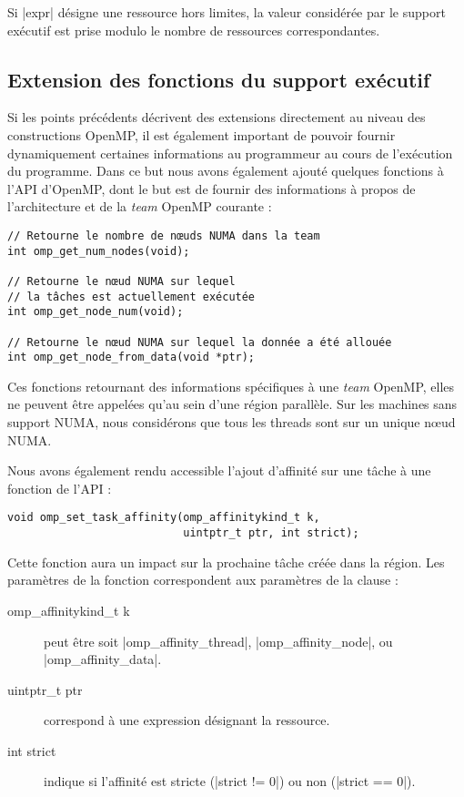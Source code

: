 Si |expr| désigne une ressource hors limites, la valeur considérée par le support exécutif est prise modulo le nombre de ressources correspondantes.

\subsection{Extension des fonctions du support exécutif}

Si les points précédents décrivent des extensions directement au niveau des constructions OpenMP, il est également important de pouvoir fournir dynamiquement certaines informations au programmeur au cours de l'exécution du programme.
Dans ce but nous avons également ajouté quelques fonctions à l'API d'OpenMP, dont le but est de fournir des informations à propos de l'architecture et de la \emph{team} OpenMP courante :

\begin{lstlisting}
// Retourne le nombre de nœuds NUMA dans la team
int omp_get_num_nodes(void);

// Retourne le nœud NUMA sur lequel
// la tâches est actuellement exécutée
int omp_get_node_num(void);

// Retourne le nœud NUMA sur lequel la donnée a été allouée
int omp_get_node_from_data(void *ptr);
\end{lstlisting}

Ces fonctions retournant des informations spécifiques à une \emph{team} OpenMP, elles ne peuvent être appelées qu'au sein d'une région parallèle.
Sur les machines sans support NUMA, nous considérons que tous les threads sont sur un unique nœud NUMA.

Nous avons également rendu accessible l'ajout d'affinité sur une tâche à une fonction de l'API :
\begin{lstlisting}
void omp_set_task_affinity(omp_affinitykind_t k,
                           uintptr_t ptr, int strict);
\end{lstlisting}
Cette fonction aura un impact sur la prochaine tâche créée dans la région.
Les paramètres de la fonction correspondent aux paramètres de la clause :

\begin{description}
  \item [omp\_affinitykind\_t k] peut être soit |omp_affinity_thread|, |omp_affinity_node|, ou |omp_affinity_data|.
  \item [uintptr\_t ptr] correspond à une expression désignant la ressource.
  \item [int strict] indique si l'affinité est stricte (|strict != 0|) ou non (|strict == 0|).
\end{description}


